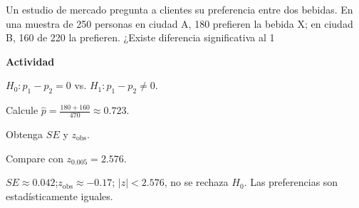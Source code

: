 \begin{ejercicio}
Un estudio de mercado pregunta a clientes su preferencia entre dos bebidas.
En una muestra de 250 personas en ciudad A, 180 prefieren la bebida X;
en ciudad B, 160 de 220 la prefieren.
¿Existe diferencia significativa al 1%


\textbf{Actividad}
\begin{pasos}
  \item $H_0:p_1-p_2=0$ vs. $H_1:p_1-p_2\neq 0$.
  \item Calcule $\hat{p}=\tfrac{180+160}{470}\approx 0.723$.
  \item Obtenga $SE$ y $z_{\text{obs}}$.
  \item Compare con $z_{0.005}=2.576$.
\end{pasos}

\begin{clave}
$SE\approx 0.042$;\quad $z_{\text{obs}}\approx -0.17$;\quad
$|z|<2.576$, no se rechaza $H_0$.
Las preferencias son estadísticamente iguales.
\end{clave}
\end{ejercicio}

